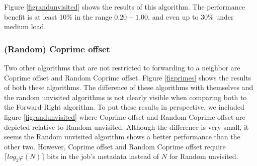 \documentclass[10pt,a4paper]{article}
\begin{document}
Figure \ref{figrandunvisited} shows the results of this algorithm. The performance benefit is at least $10 \%$ in the range $0.20 - 1.00$, and even up to $30 \%$ under medium load.

\subsubsection*{(Random) Coprime offset}
Two other algorithms that are not restricted to forwarding to a neighbor are Coprime offset and Random Coprime offset. Figure \ref{figprimes} shows the results of both these algorithms. The difference of these algorithms with themselves and the random unvisited algorithms is not clearly visible when comparing both to the Forward Right algorithm. To put these results in perspective, we included figure \ref{figrandunvisited} where Coprime offset and Random Coprime offset are depicted relative to Random unvisited. Although the difference is very small, it seems the Random unvisited algorithm shows a better performance than the other two. However, Coprime offset and Random Coprime offset require $\lceil log_2 \varphi(N) \rceil$ bits in the job's metadata instead of $N$ for Random unvisited.
\end{document}
